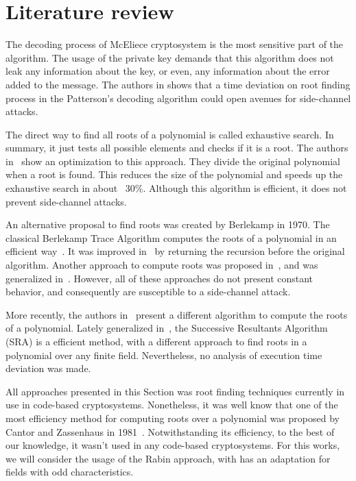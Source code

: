 \section{Literature review}
The decoding process of McEliece cryptosystem is the most sensitive part of the algorithm. The usage of the private key demands that this algorithm does not leak any information about the key, or even, any information about the error added to the message. The authors in \cite{bucerzan2017improved} shows that a time deviation on root finding process in the Patterson's decoding algorithm could open avenues for side-channel attacks. 

The direct way to find all roots of a polynomial is called exhaustive search. In summary, it just tests all possible elements and checks if it is a root. The authors in~\cite{strenzke2012fast} show an optimization to this approach. They divide the original polynomial when a root is found. This reduces the size of the polynomial and speeds up the exhaustive search in about ~30\%. Although this algorithm is efficient, it does not prevent side-channel attacks.

An alternative proposal to find roots was created by Berlekamp in 1970. The classical Berlekamp Trace Algorithm computes the roots of a polynomial in an efficient way~\cite{berlekamp1970factoring}. It was improved in~\cite{strenzke2012fast} by returning the recursion before the original algorithm. Another approach to compute roots was proposed in~\cite{fedorenko2002finding}, and was generalized in~\cite{Skachek2008,biswas2009}. However, all of these approaches do not present constant behavior, and consequently are susceptible to a side-channel attack.

More recently, the authors in~\cite{petit2014finding} present a different algorithm to compute the roots of a polynomial. Lately generalized in~\cite{petit2016finding}, the Successive Resultants Algorithm (SRA) is a efficient method, with a different approach to find roots in a polynomial over any finite field. Nevertheless, no analysis of execution time deviation was made.

All approaches presented in this Section was root finding techniques currently in use in code-based cryptosystems. Nonetheless, it was well know that one of the most efficiency method for computing roots over a polynomial was proposed by Cantor and Zassenhaus in 1981~\cite{cantor1981new}. Notwithstanding its efficiency, to the best of our knowledge, it wasn't used in any code-based cryptosystems. For this works, we will consider the usage of the Rabin approach, with has an adaptation for fields with odd characteristics.